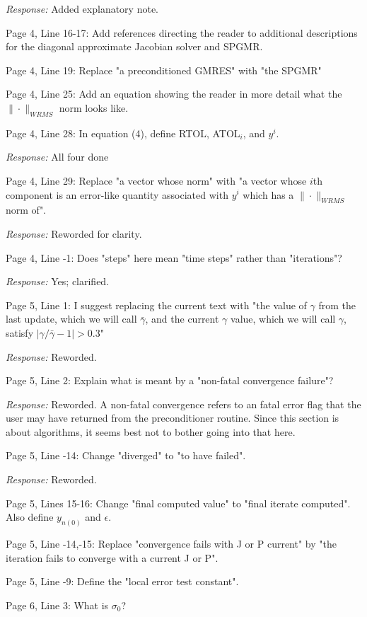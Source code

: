 \documentclass[12pt]{letter}
\begin{document}
{\em Response:} Added explanatory note.

Page 4, Line 16-17: Add references directing the reader to additional
descriptions for the diagonal approximate Jacobian solver and SPGMR.

Page 4, Line 19: Replace "a preconditioned GMRES" with "the SPGMR"

Page 4, Line 25: Add an equation showing the reader in more detail
what the $\|\cdot\|_{WRMS}$ norm looks like.

Page 4, Line 28: In equation (4), define RTOL, ATOL$_i$, and $y^i$.

{\em Response:} All four done

Page 4, Line 29: Replace "a vector whose norm" with "a vector whose $i$th
component is an error-like quantity associated with $y^i$ which has a
$\|\cdot\|_{WRMS}$ norm of".

{\em Response:} Reworded for clarity.

Page 4, Line -1: Does "steps" here mean "time steps" rather than "iterations"?

{\em Response:} Yes; clarified.

Page 5, Line 1: I suggest replacing the current text with "the value
of $\gamma$ from the last update, which we will call $\bar{\gamma}$,
and the current $\gamma$ value, which we will call $\gamma$, satisfy
$|\gamma/\bar{\gamma} - 1| > 0.3 $"

{\em Response:} Reworded.

Page 5, Line 2: Explain what is meant by a "non-fatal convergence failure"?

{\em Response:} Reworded.  A non-fatal convergence refers to an fatal
error flag that the user may have returned from the preconditioner
routine.  Since this section is about algorithms, it seems best not to
bother going into that here.

Page 5, Line -14: Change "diverged" to "to have failed".

{\em Response:} Reworded.

Page 5, Lines 15-16: Change "final computed value" to "final iterate
computed". Also define $y_{n(0)}$ and $\epsilon$.

Page 5, Line -14,-15: Replace "convergence fails with J or P current" by
"the iteration fails to converge with a current J or P".

Page 5, Line -9: Define the "local error test constant".

Page 6, Line 3: What is $\sigma_ 0$?
\end{document}
